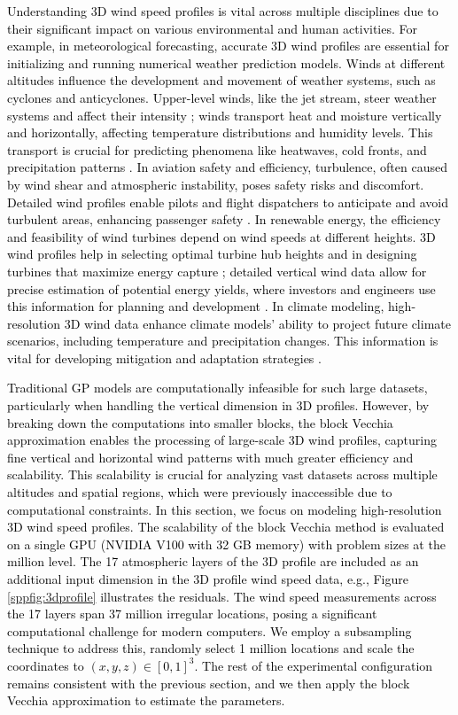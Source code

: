 \documentclass[12pt]{article}
\begin{document}
\textcolor{black}{
Understanding 3D wind speed profiles is vital across multiple disciplines due to their significant impact on various environmental and human activities. 
For example, 
in meteorological forecasting, accurate 3D wind profiles are essential for initializing and running numerical weather prediction models. Winds at different altitudes influence the development and movement of weather systems, such as cyclones and anticyclones. Upper-level winds, like the jet stream, steer weather systems and affect their intensity \citep{kalnay2003}; winds transport heat and moisture vertically and horizontally, affecting temperature distributions and humidity levels. This transport is crucial for predicting phenomena like heatwaves, cold fronts, and precipitation patterns \citep{holton2012}.
In aviation safety and efficiency, turbulence, often caused by wind shear and atmospheric instability, poses safety risks and discomfort. Detailed wind profiles enable pilots and flight dispatchers to anticipate and avoid turbulent areas, enhancing passenger safety \citep{storer2019aviation}.
In renewable energy, the efficiency and feasibility of wind turbines depend on wind speeds at different heights. 3D wind profiles help in selecting optimal turbine hub heights and in designing turbines that maximize energy capture \citep{manwell2010}; detailed vertical wind data allow for precise estimation of potential energy yields, where investors and engineers use this information for planning and development \citep{burton2011}. 
In climate modeling, high-resolution 3D wind data enhance climate models' ability to project future climate scenarios, including temperature and precipitation changes. This information is vital for developing mitigation and adaptation strategies \citep{ipcc2021}.
}

\textcolor{black}{
Traditional GP models are computationally infeasible for such large datasets, particularly when handling the vertical dimension in 3D profiles. However, by breaking down the computations into smaller blocks, the block Vecchia approximation enables the processing of large-scale 3D wind profiles, capturing fine vertical and horizontal wind patterns with much greater efficiency and scalability. This scalability is crucial for analyzing vast datasets across multiple altitudes and spatial regions, which were previously inaccessible due to computational constraints.
In this section, we focus on modeling high-resolution 3D wind speed profiles. The scalability of the block Vecchia method is evaluated on a single GPU (NVIDIA V100 with 32 GB memory) with problem sizes at the million level. The 17 atmospheric layers of the 3D profile are included as an additional input dimension in the 3D profile wind speed data, e.g., Figure \ref{sppfig:3dprofile} illustrates the residuals. The wind speed measurements across the 17 layers span 37 million irregular locations, posing a significant computational challenge for modern computers. We employ a subsampling technique to address this, randomly select 1 million locations and scale the coordinates to $(x,y,z) \in [0,1]^3$. The rest of the experimental configuration remains consistent with the previous section, and we then apply the block Vecchia approximation to estimate the parameters. 
}
\end{document}
